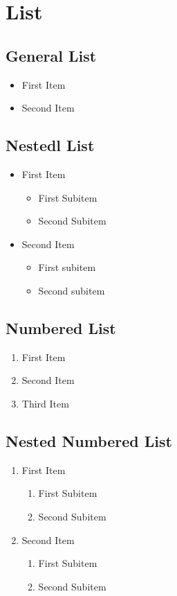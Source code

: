 \section{List}
\subsection{General List}
	\begin{itemize}
		\item{First Item}
		\item{Second Item}
	\end{itemize}

\subsection{Nestedl List}
	\begin{itemize}
		\item{First Item}
		\begin{itemize}
			\item{First Subitem}
			\item{Second Subitem}
		\end{itemize}
		
		\item{Second Item}
			\begin{itemize}
			\item{First subitem}
			\item{Second subitem}
		\end{itemize}
	\end{itemize}


\subsection{Numbered List}
\begin{enumerate}
	\item{First Item}
	\item{Second Item}
	\item{Third Item}
\end{enumerate}

\subsection{Nested Numbered List}
\begin{enumerate}

	\item{First Item}
	\begin{enumerate}
		\item{First Subitem}
		\item{Second Subitem}
	\end{enumerate}
	
	\item{Second Item}
	\begin{enumerate}
		\item{First Subitem}
		\item{Second Subitem}
	\end{enumerate}
	
\end{enumerate}


